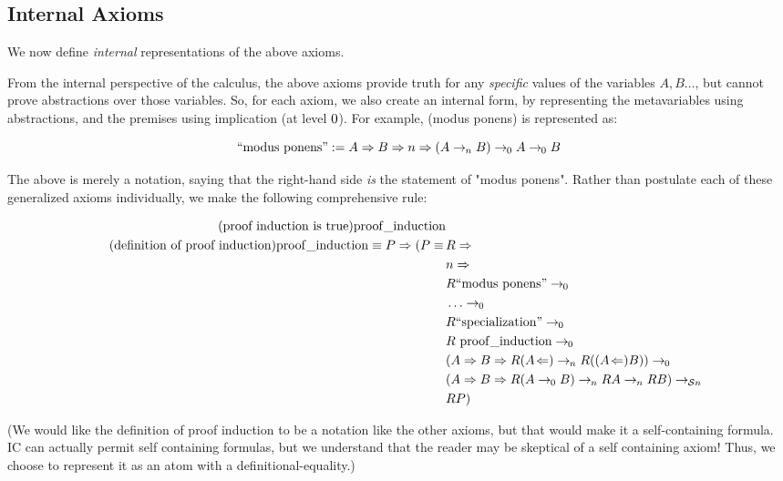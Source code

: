 \documentclass{article}
\begin{document}
  \subsection{Internal Axioms}

  We now define \emph{internal} representations of the above axioms.

  From the internal perspective of the calculus, the above axioms provide truth for any \emph{specific} values of the variables $A, B\dots$, but cannot prove abstractions over those variables.
  So, for each axiom, we also create an internal form, by representing the metavariables using abstractions, and the premises using implication (at level $0$).
  For example, (modus ponens) is represented as:

  \begin{equation*}
    \mathrm{``modus\ ponens"} := A \Rightarrow B \Rightarrow n \Rightarrow (A \rightarrow_{\hspace{-0.04em}n} B) \rightarrow_{\hspace{-0.04em}0} A \rightarrow_{\hspace{-0.04em}0} B
  \end{equation*}
  
  The above is merely a notation, saying that the right-hand side \emph{is} the statement of "modus ponens". Rather than postulate each of these generalized axioms individually, we make the following comprehensive rule:
  
  \setlength{\jot}{0em}
  \begin{align*}
    \tag{proof induction is true}\label{indt}
    \mathrm{proof\_induction}\\
    \tag{definition of proof induction}\label{indd}
    \mathrm{proof\_induction} \equiv \nameabst{P} (P \equiv\,&\nameabst{R}\\
      &\nameabst{n}\\
      &R\mathrm{``modus\ ponens"} \implies{\lzero}\\
      &\dots \implies{\lzero}\\
      &R\mathrm{``specialization"} \implies{\lzero}\\
      &R\ \mathrm{proof\_induction} \implies{\lzero}\\
      &(\nameabst{A}\nameabst{B}R(\abst{A})\implies{n}R((\abst{A})B)) \implies{\lzero}\\
      &(\nameabst{A}\nameabst{B}R(A\implies{\lzero}B)\implies{n}RA\implies{n}RB) \implies{\lsucc{n}}\\
      &RP)\\
  \end{align*}

  (We would like the definition of proof induction to be a notation like the other axioms, but that would make it a self-containing formula. IC can actually permit self containing formulas, but we understand that the reader may be skeptical of a self containing axiom! Thus, we choose to represent it as an atom with a definitional-equality.)
  
\end{document}

